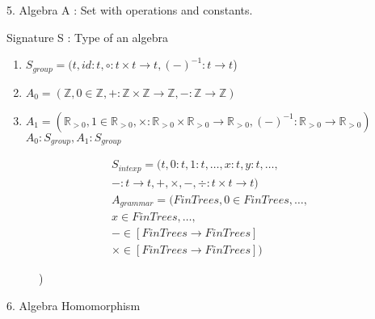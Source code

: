 \documentclass{report}[12pt]
\begin{document}
5. Algebra A : Set with operations and constants.

Signature S : Type of an algebra

\begin{enumerate}
    \item $S_{group} = (t, id:t, \circ:t\times t \rightarrow t, (-)^{-1}:t\rightarrow t$)
    \item $A_0 = (\mathbb{Z}, 0\in \mathbb{Z}, +:\mathbb{Z}\times \mathbb{Z}\rightarrow \mathbb{Z}, -:\mathbb{Z}\rightarrow \mathbb{Z})$
    \item $A_1 = (\mathbb{R}_{>0}, 1 \in \mathbb{R}_{>0}, \times:\mathbb{R}_{>0}\times\mathbb{R}_{>0}\rightarrow \mathbb{R}_{>0}, (-)^{-1}:\mathbb{R}_{>0} \rightarrow \mathbb{R}_{>0})$ \\
    $A_0 : S_{group}, A_1:S_{group}$
\end{enumerate}
\begin{align*}
    S_{intexp} = (t, 0:t, 1:t, \ldots, x:t, y:t, \ldots, \\
    -:t\rightarrow t, +, \times, -, \div : t \times t \rightarrow t) \\
    A_{grammar} = (FinTrees, 0\in FinTrees, \ldots, \\
    x\in FinTrees, \ldots, \\
    - \in [FinTrees \rightarrow FinTrees] \\
    \times \in [FinTrees \rightarrow FinTrees])
\end{align*}
\begin{figure}[h]
     \hspace{1cm}
    )
\end{figure}
6. Algebra Homomorphism
\end{document}
